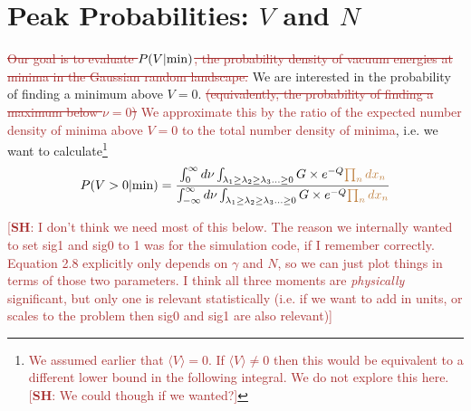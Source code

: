 \documentclass[12pt]{article}
\newcommand{\re}[1]{\textcolor{blue}{[{\bf RE}: #1]}}
\newcommand{\SH}[1]{\textcolor{brown}{[{\bf SH}: #1]}}
\newcommand{\sh}[1]{\textcolor{brown}{#1}}
\begin{document}



\section{Peak Probabilities: $V$ and $N$} \label{PeakNumbers}

\sh{\sout{Our goal is to evaluate $P(V|{\rm min})$, the probability density of vacuum energies at minima in the Gaussian random landscape.}} We are interested in the probability of finding a minimum above $V = 0$. \sh{\sout{(equivalently, the probability of finding a maximum below $\nu = 0$)} We approximate this by the ratio of the expected number density of minima above $V=0$ to the total number density of minima}, i.e. we want to calculate\footnote{\sh{We assumed earlier that $\langle V \rangle = 0$. If $\langle V \rangle \neq 0$ then this would be equivalent to a different lower bound in the following integral. We do not explore this here. \SH{We could though if we wanted?}}}
\begin{equation} \label{PminIntegral}
  P(V>0|{\rm min}) =  \frac{\int^\infty_0 d\nu \int_{\lambda_1 \geq \lambda_2 \geq \lambda_3 \ldots \geq 0} G \times e^{-Q} \sh{\prod_n dx_n}}{\int^\infty_{-\infty} d\nu \int_{\lambda_1 \geq \lambda_2 \geq \lambda_3 \ldots \geq 0} G \times e^{-Q} \sh{\prod_n dx_n}}
  \end{equation}

\SH{I don't think we need most of this below. The reason we internally wanted to set sig1 and sig0 to 1 was for the simulation code, if I remember correctly. Equation 2.8 explicitly only depends on $\gamma$ and $N$, so we can just plot things in terms of those two parameters. I think all three moments are \emph{physically} significant, but only one is relevant statistically (i.e. if we want to add in units, or scales to the problem then sig0 and sig1 are also relevant)}
\end{document}
